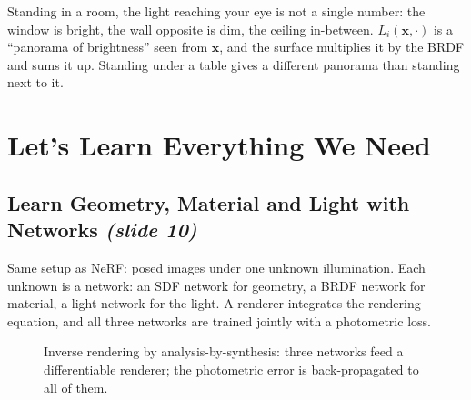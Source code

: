 \documentclass[11pt,a4paper]{article}
\newcommand{\slideone}[1]{\texorpdfstring{\emph{(slide #1)}}{(slide #1)}}
\newcommand{\x}{{\bm{x}}}
\newcommand{\Li}{L_i}
\theoremstyle{definition}
\theoremstyle{plain}
\theoremstyle{remark}
\begin{document}
\begin{intuition}
Standing in a room, the light reaching your eye is not a single number: the window is bright, the wall opposite is dim, the ceiling in-between. $\Li(\x,\cdot)$ is a ``panorama of brightness'' seen from $\x$, and the surface multiplies it by the BRDF and sums it up. Standing under a table gives a different panorama than standing next to it.
\end{intuition}

\section{Let's Learn Everything We Need }

\subsection{Learn Geometry, Material and Light with Networks \slideone{10}}

Same setup as NeRF: posed images under one unknown illumination. Each unknown is a network: an SDF network for geometry, a BRDF network for material, a light network for the light. A renderer integrates the rendering equation, and all three networks are trained jointly with a photometric loss.

\begin{figure}[!htbp]\centering
{}
\caption{Inverse rendering by analysis-by-synthesis: three networks feed a differentiable renderer; the photometric error is back-propagated to all of them.}
\end{figure}
\end{document}
